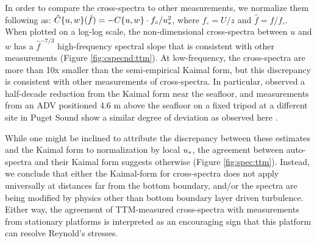 In order to compare the cross-spectra to other measurements, we normalize them following \cite[]{Kaimal++1972} as: $\hat{C}\{u,w\}(\hat{f}) = -C\{u,w\} \cdot f_\circ / u_*^2$, where $f_\circ = U / z$ and $\hat{f} = f / f_\circ$. 
When plotted on a log-log scale, the non-dimensional cross-spectra between $u$ and $w$ has a $\hat{f}^{-7/3}$ high-frequency spectral slope that is consistent with other measurements (Figure \ref{fig:cspecnd:ttm}). At low-frequency, the cross-spectra are more than 10x smaller than the semi-empirical Kaimal form, but this discrepancy is consistent with other measurements of cross-spectra. In particular, \cite{Walter++2011} observed a half-decade reduction from the Kaimal form near the seafloor, and measurements from an ADV positioned 4.6 m above the seafloor on a fixed tripod at a different site in Puget Sound show a similar degree of deviation as observed here \cite[]{Thomson++2012}. %

While one might be inclined to attribute the discrepancy between these estimates and the Kaimal form to normalization by local $u_*$, the agreement between auto-spectra and their Kaimal form suggests otherwise (Figure \ref{fig:spec:ttm}). Instead, we conclude that either the Kaimal-form for cross-spectra does not apply universally at distances far from the bottom boundary, and/or the spectra are being modified by physics other than bottom boundary layer driven turbulence. Either way, the agreement of TTM-measured cross-spectra with measurements from stationary platforms is interpreted as an encouraging sign that this platform can resolve Reynold's stresses.

